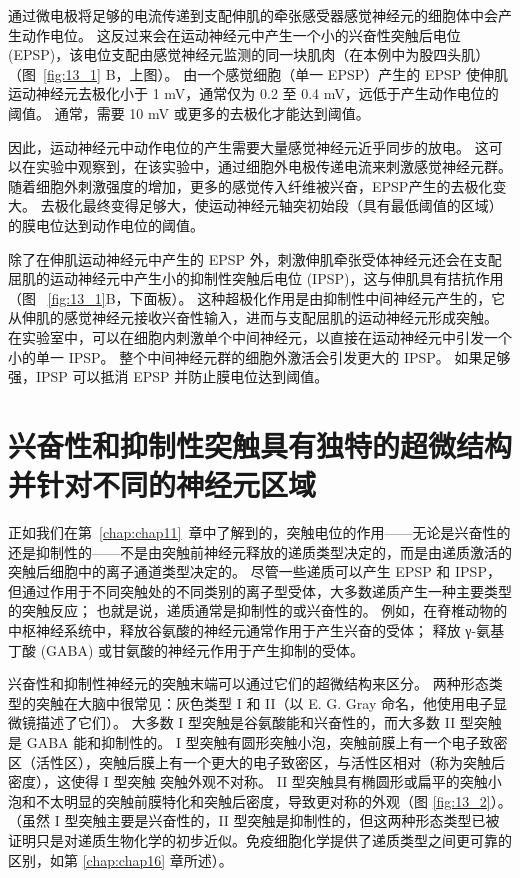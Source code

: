 通过微电极将足够的电流传递到支配伸肌的牵张感受器感觉神经元的细胞体中会产生动作电位。
这反过来会在运动神经元中产生一个小的兴奋性突触后电位 (EPSP)，该电位支配由感觉神经元监测的同一块肌肉（在本例中为股四头肌）（图~\ref{fig:13_1} B，上图）。
由一个感觉细胞（单一 EPSP）产生的 EPSP 使伸肌运动神经元去极化小于 1 mV，通常仅为 0.2 至 0.4 mV，远低于产生动作电位的阈值。
通常，需要 10 mV 或更多的去极化才能达到阈值。


因此，运动神经元中动作电位的产生需要大量感觉神经元近乎同步的放电。
这可以在实验中观察到，在该实验中，通过细胞外电极传递电流来刺激感觉神经元群。
随着细胞外刺激强度的增加，更多的感觉传入纤维被兴奋，EPSP产生的去极化变大。
去极化最终变得足够大，使运动神经元轴突初始段（具有最低阈值的区域）的膜电位达到动作电位的阈值。


除了在伸肌运动神经元中产生的 EPSP 外，刺激伸肌牵张受体神经元还会在支配屈肌的运动神经元中产生小的抑制性突触后电位 (IPSP)，这与伸肌具有拮抗作用（图 ~\ref{fig:13_1}B，下面板）。
这种超极化作用是由抑制性中间神经元产生的，它从伸肌的感觉神经元接收兴奋性输入，进而与支配屈肌的运动神经元形成突触。
在实验室中，可以在细胞内刺激单个中间神经元，以直接在运动神经元中引发一个小的单一 IPSP。
整个中间神经元群的细胞外激活会引发更大的 IPSP。
如果足够强，IPSP 可以抵消 EPSP 并防止膜电位达到阈值。



\section{兴奋性和抑制性突触具有独特的超微结构并针对不同的神经元区域}

正如我们在第~\ref{chap:chap11}~章中了解到的，突触电位的作用——无论是兴奋性的还是抑制性的——不是由突触前神经元释放的递质类型决定的，而是由递质激活的突触后细胞中的离子通道类型决定的。
尽管一些递质可以产生 EPSP 和 IPSP，但通过作用于不同突触处的不同类别的离子型受体，大多数递质产生一种主要类型的突触反应；
也就是说，递质通常是抑制性的或兴奋性的。
例如，在脊椎动物的中枢神经系统中，释放谷氨酸的神经元通常作用于产生兴奋的受体；
释放 γ-氨基丁酸 (GABA) 或甘氨酸的神经元作用于产生抑制的受体。


兴奋性和抑制性神经元的突触末端可以通过它们的超微结构来区分。 
两种形态类型的突触在大脑中很常见：灰色类型 I 和 II（以 E. G. Gray 命名，他使用电子显微镜描述了它们）。
大多数 I 型突触是谷氨酸能和兴奋性的，而大多数 II 型突触是 GABA 能和抑制性的。
I 型突触有圆形突触小泡，突触前膜上有一个电子致密区（活性区），突触后膜上有一个更大的电子致密区，与活性区相对（称为突触后密度），这使得 I 型突触 突触外观不对称。 
II 型突触具有椭圆形或扁平的突触小泡和不太明显的突触前膜特化和突触后密度，导致更对称的外观（图 \ref{fig:13_2}）。 
（虽然 I 型突触主要是兴奋性的，II 型突触是抑制性的，但这两种形态类型已被证明只是对递质生物化学的初步近似。免疫细胞化学提供了递质类型之间更可靠的区别，如第 \ref{chap:chap16} 章所述）。

